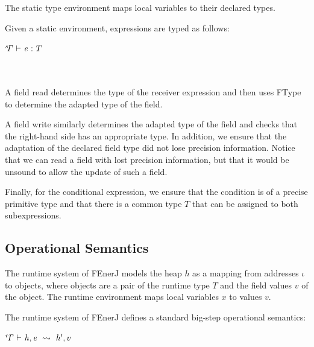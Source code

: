 The static type environment \sG{} maps local variables to their
declared types.

Given a static environment, expressions are typed as follows:

\vspace{0.5ex}
\noindent
\begin{ottdefnblock}[#1]{$ \mathit{ {^s}\!\Gamma} \  \textsf{$\vdash$} \  \mathit{e} \  \textsf{:} \  T $}{}
\ottusedrule{\ottdruletrXXread{}}\\[2mm]
\ottusedrule{\ottdruletrXXwrite{}}\\[2mm]
\ottusedrule{\ottdruletrXXcond{}}\\
\end{ottdefnblock}

A field read determines the type of the receiver expression and then
uses FType to determine the adapted type of the field.

A field write similarly determines the adapted type of the field and
checks that the right-hand side has an appropriate type.
In addition, we ensure that the adaptation of the declared field type
did not lose precision information.
Notice that we can read a field with lost precision information, but
that it would be unsound to allow the update of such a field.

Finally, for the conditional expression, we ensure that the condition
is of a precise primitive type and that there is a common type $T$
that can be assigned to both subexpressions.



\subsection{Operational Semantics}

The runtime system of FEnerJ models the heap $h$ as a mapping from
addresses $\iota$ to objects, where objects are a pair of the runtime
type $T$ and the field values $v$ of the object.
The runtime environment \rG{} maps local variables $x$ to values
$v$.

The runtime system of FEnerJ defines a standard big-step operational
semantics:

\vspace{0.5ex}
\noindent
\begin{ottdefnblock}[#1]{$ \mathit{ {^r}\!\Gamma} \  \textsf{$\vdash$} \  \mathit{h} ,  \mathit{e} \ \leadsto\  \mathit{h'} ,  v $}{}
\ottusedrule{\ottdruleosXXread{}}\\[1mm plus 1mm minus .5mm]
\ottusedrule{\ottdruleosXXwrite{}}\\[1mm plus 1mm minus .5mm]
\ottusedrule{\ottdruleosXXcondXXt{}}\\[1mm plus 1mm minus .5mm]
\ottusedrule{\ottdruleosXXcondXXf{}}\\
\end{ottdefnblock}

